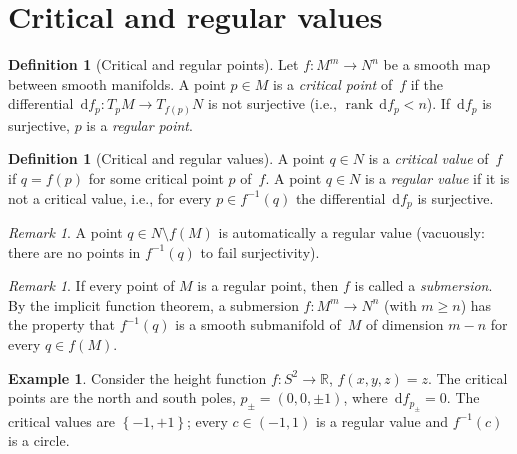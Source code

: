 \documentclass[12pt,a4paper,openany]{book}
\theoremstyle{definition}
\newtheorem{definition}[theorem]{Definition}
\newtheorem{example}[theorem]{Example}
\theoremstyle{remark}
\newtheorem{remark}[theorem]{Remark}
\newcommand{\R}{\mathbb{R}}
\newcommand{\dd}{\,\mathrm{d}}
\newcommand{\set}[1]{\left\{ #1 \right\}}
\begin{document}
\section{Critical and regular values}\label{sec:critical-regular}

\begin{definition}[Critical and regular points]\label{def:critical-pt}
Let $f\colon M^m\to N^n$ be a smooth map between smooth manifolds.
A point $p\in M$ is a \emph{critical point} of~$f$
if the differential $\dd f_p\colon T_pM\to T_{f(p)}N$ is not surjective
(i.e., $\operatorname{rank}\dd f_p < n$).  If $\dd f_p$ is surjective,
$p$ is a \emph{regular point}.
\end{definition}

\begin{definition}[Critical and regular values]\label{def:critical-val}
A point $q\in N$ is a \emph{critical value} of~$f$ if
$q = f(p)$ for some critical point $p$ of~$f$.  A point $q\in N$
is a \emph{regular value} if it is not a critical value, i.e., for
every $p\in f^{-1}(q)$ the differential $\dd f_p$ is surjective.
\end{definition}

\begin{remark}\label{rem:regular-value-not-in-image}
A point $q\in N\setminus f(M)$ is automatically a regular value
(vacuously: there are no points in $f^{-1}(q)$ to fail surjectivity).
\end{remark}

\begin{remark}\label{rem:submersion}
If every point of $M$ is a regular point, then $f$ is called a
\emph{submersion}.  By the implicit function theorem, a submersion
$f\colon M^m\to N^n$ (with $m\ge n$) has the property that $f^{-1}(q)$
is a smooth submanifold of~$M$ of dimension $m-n$ for every $q\in f(M)$.
\end{remark}

\begin{example}\label{ex:height-function}
Consider the height function $f\colon S^2\to\R$, $f(x,y,z) = z$.
The critical points are the north and south poles, $p_\pm = (0,0,\pm 1)$,
where $\dd f_{p_\pm} = 0$.  The critical values are $\set{-1,+1}$;
every $c\in(-1,1)$ is a regular value and $f^{-1}(c)$ is a circle.
\end{example}
\end{document}
